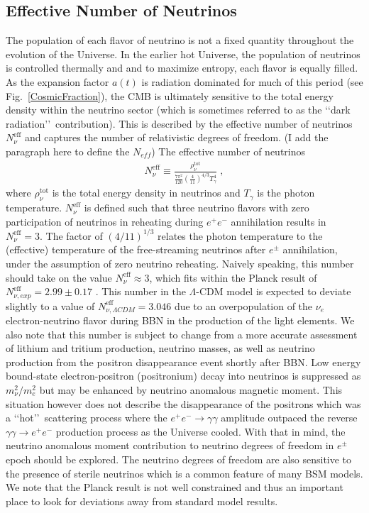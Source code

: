 \documentclass[universe,article,submit,moreauthors,pdftex,a4paper]{Definitions/mdpi}
\newcommand*{\rf}[1]{Fig.~{\ref{#1}}}
\newcommand*{\xblue}{\color{blue}}
\begin{document}
\subsection{Effective Number of Neutrinos}\label{sec:EffectiveNeutrino}
\noindent The population of each flavor of neutrino is not a fixed quantity throughout the evolution of the Universe. In the earlier hot Universe, the population of neutrinos is controlled thermally and and to maximize entropy, each flavor is equally filled. As the expansion factor $a(t)$ is radiation dominated for much of this period (see \rf{CosmicFraction}), the CMB is ultimately sensitive to the total energy density within the neutrino sector (which is sometimes referred to as the \lq\lq dark radiation\rq\rq\ contribution). This is described by the effective number of neutrinos $N_{\nu}^{\mathrm{eff}}$ and captures the number of relativistic degrees of freedom. {\xblue (I add the paragraph here to define the $N_{eff}$) The effective number of neutrinos 
\begin{align}\label{Neff}
N_\nu^{\mathrm{eff}}\equiv\frac{\rho^{\mathrm{tot}}_\nu}{\frac{7\pi^2}{120}\left(\frac{4}{11}\right)^{4/3}T_\gamma^4}\;,
\end{align}
where $\rho_\nu^{\mathrm{tot}}$ is the total energy density in neutrinos and $T_\gamma$ is the photon temperature. $N_\nu^{\mathrm{eff}}$ is defined such that three neutrino flavors with zero participation of neutrinos in reheating during $e^+e^-$ annihilation results in $N_\nu^{\mathrm{eff}}=3$. The factor of $\left(4/11\right)^{1/3}$ relates the photon temperature to the (effective) temperature of the free-streaming neutrinos after $e^\pm$ annihilation, under the assumption of zero neutrino reheating.}
Naively speaking, this number should take on the value $N_{\nu}^{\mathrm{eff}}\approx3$, which fits within the Planck result of $N_{\nu, exp}^{\mathrm{eff}}=2.99\pm0.17$ \cite{Planck:2018vyg}. This number in the $\Lambda$-CDM model is expected to deviate slightly to a value of $N_{\nu, \Lambda CDM}^{\mathrm{eff}}=3.046$ due to an overpopulation of the $\nu_{e}$ electron-neutrino flavor during BBN in the production of the light elements. We also note that this number is subject to change from a more accurate assessment of lithium and tritium production, neutrino masses, as well as neutrino production from the positron disappearance event shortly after BBN. Low energy bound-state electron-positron (positronium) decay into neutrinos is suppressed as $m_{\nu}^{2}/m_{e}^{2}$ \cite{Govaerts:1996dt,Adkins:2022omi} but may be enhanced by neutrino anomalous magnetic moment. This situation however does not describe the disappearance of the positrons which was a \lq\lq hot\rq\rq\ scattering process where the $e^{+}e^{-}\rightarrow\gamma\gamma$ amplitude outpaced the reverse $\gamma\gamma\rightarrow e^{+}e^{-}$ production process as the Universe cooled. With that in mind, the neutrino anomalous moment contribution to neutrino degrees of freedom in $e^{\pm}$ epoch should be explored. The neutrino degrees of freedom are also sensitive to the presence of sterile neutrinos which is a common feature of many BSM models. We note that the Planck result is not well constrained and thus an important place to look for deviations away from standard model results.
\end{document}
